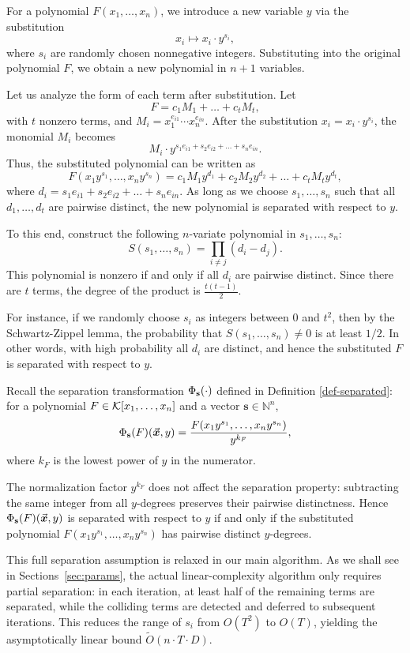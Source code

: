 \documentclass{article}
\numberwithin{equation}{section}
\begin{document}
For a polynomial $F(x_1, \dots, x_n)$, we introduce a new variable $y$ via the substitution
\[
x_i \longmapsto x_i \cdot y^{s_i},
\]
where $s_i$ are randomly chosen nonnegative integers. Substituting into the original polynomial $F$, we obtain a new polynomial in $n+1$ variables.

Let us analyze the form of each term after substitution. Let
\[
F = c_1 M_1 + \dots + c_t M_t,
\]
with $t$ nonzero terms, and
%
$M_i = x_1^{e_{i1}} \cdots x_n^{e_{in}}.$
%
After the substitution $x_i = x_i \cdot y^{s_i}$, the monomial $M_i$ becomes
\[
M_i \cdot y^{s_1 e_{i1} + s_2 e_{i2} + \dots + s_n e_{in}}.
\]
Thus, the substituted polynomial can be written as
\[
F(x_1 y^{s_1},\dots,x_n y^{s_n}) = c_1 M_1 y^{d_1} + c_2 M_2 y^{d_2} + \dots + c_t M_t y^{d_t},
\]
where
%
$d_i = s_1 e_{i1} + s_2 e_{i2} + \dots + s_n e_{in}.$
%
As long as we choose $s_1, \dots, s_n$ such that all $d_1, \dots, d_t$ are pairwise distinct, the new polynomial is separated with respect to $y$.

To this end, construct the following $n$-variate polynomial in $s_1, \dots, s_n$:
\[
S(s_1, \dots, s_n) = \prod_{i \neq j} (d_i - d_j).
\]
This polynomial is nonzero if and only if all $d_i$ are pairwise distinct. Since there are $t$ terms, the degree of the product is $\frac{t(t-1)}{2}$.

For instance, if we randomly choose $s_i$ as integers between $0$ and $t^2$, then by the Schwartz-Zippel lemma, the probability that $S(s_1, \dots, s_n) \neq 0$ is at least $1/2$. In other words, with high probability all $d_i$ are distinct, and hence the substituted $F$ is separated with respect to $y$.






Recall the separation transformation $\Phi_{\mathbf{s}}(\cdot)$ defined in Definition \ref{def-separated}: for a polynomial $F \in {\mathcal{K}}[x_1, \dots, x_n]$ and a vector $\mathbf{s} \in \mathbb{N}^n$,
\[
\Phi_{\mathbf{s}}(F)(\vec{\boldsymbol{x}}, y)= \frac{F(x_1 y^{s_1}, \dots, x_n y^{s_n})}{y^{k_F}},
\]
where $k_F$ is the lowest power of $y$ in the numerator.

The normalization factor $y^{k_F}$ does not affect the separation property: subtracting the same integer from all $y$-degrees preserves their pairwise distinctness. Hence $\Phi_{\mathbf{s}}(F)(\vec{\boldsymbol{x}},y)$ is separated with respect to $y$ if and only if the substituted polynomial $F(x_1 y^{s_1}, \dots, x_n y^{s_n})$ has pairwise distinct $y$-degrees.

This full separation assumption is relaxed in our main algorithm. As we shall see in Sections~\ref{sec:params}, the actual linear-complexity algorithm only requires partial separation: in each iteration, at least half of the remaining terms are separated, while the colliding terms are detected and deferred to subsequent iterations. This reduces the range of $s_i$ from $O(T^2)$ to $O(T)$, yielding the asymptotically linear bound $\widetilde{O}(n \cdot T \cdot D)$.
\end{document}
